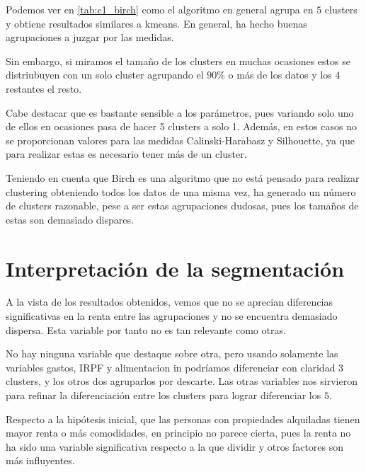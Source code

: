 Podemos ver en \eqref{tab:c1_birch} como el algoritmo en general agrupa en $5$ clusters y obtiene resultados similares a kmeans. En general, ha hecho buenas agrupaciones a juzgar por las medidas.

Sin embargo, si miramos el tamaño de los clusters en muchas ocasiones estos se distriubuyen con un solo cluster agrupando el $90\%$ o más de los datos y los $4$ restantes el resto.

Cabe destacar que es bastante sensible a los parámetros, pues variando solo uno de ellos en ocasiones pasa de hacer 5 clusters a solo 1. Además, en estos casos no se proporcionan valores para las medidas Calinski-Harabasz y Silhouette, ya que para realizar estas es necesario tener más de un cluster.

Teniendo en cuenta que Birch es una algoritmo que no está pensado para realizar clustering obteniendo todos los datos de una misma vez, ha generado un número de clusters razonable, pese a ser estas agrupaciones dudosas, pues los tamaños de estas son demasiado dispares.



\section{Interpretación de la segmentación}

A la vista de los resultados obtenidos, vemos que no se aprecian diferencias significativas en la renta entre las agrupaciones y no se encuentra demasiado dispersa. Esta variable por tanto no es tan relevante como otras.

No hay ninguna variable que destaque sobre otra, pero usando solamente las variables gastos, IRPF y alimentacion in podríamos diferenciar con claridad 3 clusters, y los otros dos agruparlos por descarte. Las otras variables nos sirvieron para refinar la diferenciación entre los clusters para lograr diferenciar los $5$.

Respecto a la hipótesis inicial, que las personas con propiedades alquiladas tienen mayor renta o más comodidades, en principio no parece cierta, pues la renta no ha sido una variable significativa respecto a la que dividir y otros factores son más influyentes.




